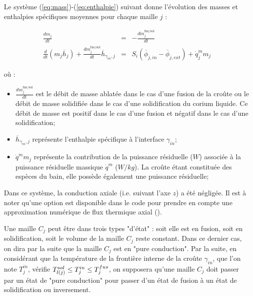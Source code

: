 Le système (\ref{eq:mass})-(\ref{eq:enthalpie}) suivant donne l'évolution des masses et enthalpies spécifiques moyennes pour chaque maille $j$ :

\begin{eqnarray}
\frac{dm_{j}}{dt} &=& - \frac{dm_{j}^\text{fus/sol}}{dt} \label{eq:mass} \\ 
 \frac{d}{dt}(m_{j}\overline{h}_{j}) + \frac{dm_{j}^\text{fus/sol}}{dt} \overline{h}_{\gamma_{in},j} & = & S_i\left(\overline{\phi}_{j,in} - \overline{\phi}_{j,ext}\right) + \dot{q}_j^m m_{j} \label{eq:enthalpie}
\end{eqnarray}

où :

\begin{itemize}
 \item $\frac{dm_j^\text{fus/sol}}{dt}$ est le débit de masse ablatée dans le cas d'une fusion de la croûte ou le débit de masse solidifiée dans le cas d'une solidification du corium liquide. Ce débit de masse est positif dans le cas d'une fusion et négatif dans le cas d'une solidification;
 \item $\overline{h}_{\gamma_{in},j}$ représente l'enthalpie spécifique à l’interface $\gamma_{in}$;
 \item $\dot{q}^m m_j$ représente la contribution de la puissance résiduelle ($W$) associée à la puissance résiduelle massique $\dot{q}^m$ ($W/kg$). La croûte étant constituée des espèces du bain, elle possède également une puissance résiduelle;
\end{itemize}
Dans ce système, la conduction axiale (i.e. suivant l'axe $z$) a été négligée. Il est à noter qu'une option est disponible dans le code pour prendre en compte une approximation numérique de flux thermique axial (\cite{Peybernes2018}). 

Une maille $C_j$ peut être dans trois types "d'état" : soit elle est en fusion, soit en solidification, soit le volume de la maille $C_j$ reste constant. Dans ce dernier cas, on dira par la suite que la maille $C_j$ est en "pure conduction". Par la suite, en considérant que la température de la frontière interne de la croûte $\gamma_{in}$, que l'on note $T_j^{in}$, vérifie $\temperature[sol]{l(j)}\leq T_j^{in}\leq T_j^{fus}$, on supposera qu'une maille $C_j$ doit passer par un état de "pure conduction" pour passer d'un état de fusion à un état de solidification ou inversement.

